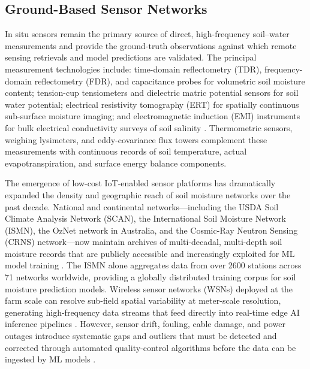 \documentclass[land,review,accept,pdftex,oneauthor]{Definitions/mdpi}
\begin{document}
\subsection{Ground-Based Sensor Networks}

In situ sensors remain the primary source of direct, high-frequency soil--water measurements and provide the ground-truth observations against which remote sensing retrievals and model predictions are validated. The principal measurement technologies include: time-domain reflectometry (TDR), frequency-domain reflectometry (FDR), and capacitance probes for volumetric soil moisture content; tension-cup tensiometers and dielectric matric potential sensors for soil water potential; electrical resistivity tomography (ERT) for spatially continuous sub-surface moisture imaging; and electromagnetic induction (EMI) instruments for bulk electrical conductivity surveys of soil salinity \citep{vereecken2014soil}. Thermometric sensors, weighing lysimeters, and eddy-covariance flux towers complement these measurements with continuous records of soil temperature, actual evapotranspiration, and surface energy balance components.

The emergence of low-cost IoT-enabled sensor platforms has dramatically expanded the density and geographic reach of soil moisture networks over the past decade. National and continental networks---including the USDA Soil Climate Analysis Network (SCAN), the International Soil Moisture Network (ISMN), the OzNet network in Australia, and the Cosmic-Ray Neutron Sensing (CRNS) network---now maintain archives of multi-decadal, multi-depth soil moisture records that are publicly accessible and increasingly exploited for ML model training \citep{dorigo2021ismn}. The ISMN alone aggregates data from over 2600 stations across 71 networks worldwide, providing a globally distributed training corpus for soil moisture prediction models. Wireless sensor networks (WSNs) deployed at the farm scale can resolve sub-field spatial variability at meter-scale resolution, generating high-frequency data streams that feed directly into real-time edge AI inference pipelines \citep{vij2020iot}. However, sensor drift, fouling, cable damage, and power outages introduce systematic gaps and outliers that must be detected and corrected through automated quality-control algorithms before the data can be ingested by ML models \citep{gruber2020}.
\end{document}

